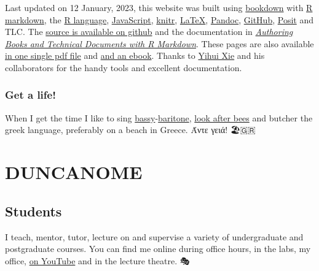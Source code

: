 \documentclass[
  12pt,
]{book}
\begin{document}
Last updated on 12 January, 2023, this website was built using \href{https://bookdown.org}{bookdown} with \href{https://en.wikipedia.org/wiki/Markdown}{R markdown}, the \href{https://en.wikipedia.org/wiki/R_(programming_language)}{R language}, \href{https://en.wikipedia.org/wiki/JavaScript}{JavaScript}, \href{https://en.wikipedia.org/wiki/Knitr}{knitr}, \href{https://latex4year1.netlify.app}{LaTeX}, \href{https://en.wikipedia.org/wiki/Pandoc}{Pandoc}, \href{https://en.wikipedia.org/wiki/GitHub}{GitHub}, \href{https://posit.co/}{Posit} and TLC. The \href{https://github.com/dullhunk/duncanome}{source is available on github} and the documentation in \emph{\href{https://bookdown.org/yihui/bookdown/}{Authoring Books and Technical Documents with R Markdown}}. These pages are also available \href{https://personalpages.manchester.ac.uk/staff/duncan.hull/duncan-hull.pdf}{in one single pdf file} and \href{https://personalpages.manchester.ac.uk/staff/duncan.hull/duncan-hull.epub}{and an ebook}. Thanks to \href{https://en.wikipedia.org/wiki/Yihui_Xie}{Yihui Xie} and his collaborators for the handy tools and excellent documentation. 🙏

\hypertarget{get-a-life}{%
\section*{Get a life!}\label{get-a-life}}

When I get the time I like to sing \href{https://en.wikipedia.org/wiki/Bass_(voice_type)}{bassy}-\href{https://en.wikipedia.org/wiki/Baritone}{baritone}, \href{http://beelife.cs.manchester.ac.uk/}{look after bees} and butcher the greek language, preferably on a beach in Greece. Άντε γειά! 🏖️🇬🇷

\hypertarget{part-duncanome}{%
\part{DUNCANOME}\label{part-duncanome}}

\hypertarget{teaching}{%
\chapter{Students}\label{teaching}}

I teach, mentor, tutor, lecture on and supervise a variety of undergraduate and postgraduate courses. You can find me online during office hours, in the labs, my office, \href{https://www.youtube.com/channel/UCLBv_u8JmyUPqmRALIjVnLg}{on YouTube} and in the lecture theatre. 🎭
\end{document}
